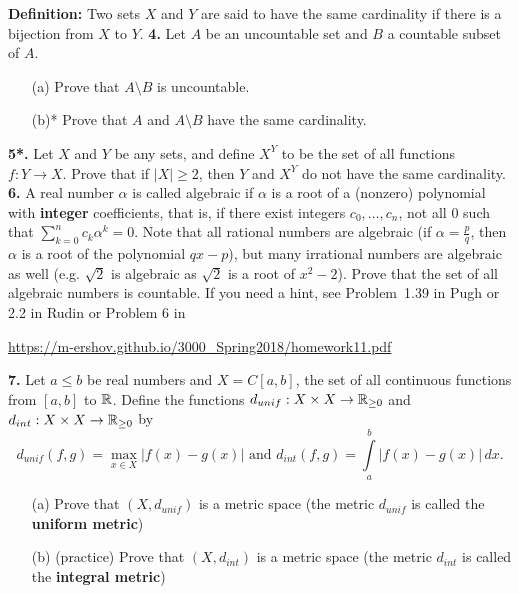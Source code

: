 \documentclass[11pt]{amsart}
\begin{document}
\skv
{\bf Definition:} Two sets $X$ and $Y$ are said to have the same cardinality
if there is a bijection from $X$ to $Y$.
\skv
{\bf 4.} Let $A$ be an uncountable set and $B$ a countable subset of $A$.
\begin{itemize}
\item[(a)] Prove that $A\setminus B$ is uncountable.
\item[(b)*] Prove that $A$ and $A\setminus B$ have the same cardinality.
\end{itemize}
\skv
{\bf 5*.} Let $X$ and $Y$ be any sets, and define $X^Y$ to be the
set of all functions $f: Y\to X$. Prove that if $|X|\geq 2$, then
$Y$ and $X^Y$ do not have the same cardinality. 
\skv
{\bf 6.} A real number $\alpha$ is called algebraic if $\alpha$ is a root of a (nonzero) polynomial with 
{\bf integer} coefficients, that is, if there exist integers $c_0,\ldots,c_n$, not all $0$ such that $\sum\limits_{k=0}^n c_k \alpha^k=0$. Note that all rational numbers are algebraic (if $\alpha=\frac{p}{q}$, then $\alpha$ is a root of the polynomial $qx-p$), but many irrational numbers are algebraic as well (e.g. $\sqrt{2}$ is algebraic as $\sqrt{2}$ is a root of $x^2-2$). 
Prove that the set of all algebraic numbers is countable.
\skv
If you need a hint, see Problem~1.39 in Pugh or 2.2 in Rudin or Problem 6 in
\skv
\centerline{
\url{https://m-ershov.github.io/3000_Spring2018/homework11.pdf}
}
\skv
{\bf 7.} Let $a\leq b$ be real numbers and $X=C[a,b]$, the set of all continuous functions
from $[a,b]$ to ${\mathbb R}$. Define the functions $d_{unif}:X\times X\to{\mathbb R}_{\geq 0}$ and $d_{int}:X\times X\to{\mathbb R}_{\geq 0}$ 
by $$d_{unif}(f,g)=\max\limits_{x\in X} |f(x)-g(x)| \mbox{ and }d_{int}(f,g)=\int\limits_{a}^b |f(x)-g(x)|\,dx.$$
\begin{itemize}
\item[(a)] Prove that $(X,d_{unif})$ is a metric space (the metric $d_{unif}$ is called the {\bf uniform metric})
\item[(b)] (practice) Prove that $(X,d_{int})$ is a metric space (the metric $d_{int}$ is called the {\bf integral metric})
\end{itemize}
\skv
\end{document}
